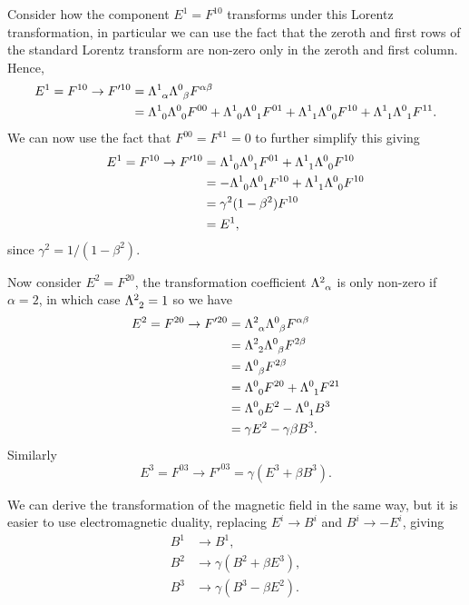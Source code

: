 Consider how the component \(E^1 = F^{10}\) transforms under this Lorentz transformation, in particular we can use the fact that the zeroth and first rows of the standard Lorentz transform are non-zero only in the zeroth and first column.
Hence,
\begin{align}
    E^1 = F^{10} \to F'^{10} &= \tensor{\Lambda}{^1_\alpha} \tensor{\Lambda}{^0_\beta}F^{\alpha\beta}\\
    &= \tensor{\Lambda}{^1_0}\tensor{\Lambda}{^0_0} F^{00} + \tensor{\Lambda}{^1_0}\tensor{\Lambda}{^0_1} F^{01} + \tensor{\Lambda}{^1_1}\tensor{\Lambda}{^0_0} F^{10} + \tensor{\Lambda}{^1_1}\tensor{\Lambda}{^0_1} F^{11}.\notag
\end{align}
We can now use the fact that \(F^{00} = F^{11} = 0\) to further simplify this giving
\begin{align}
    E^1 = F^{10} \to F'^{10} &= \tensor{\Lambda}{^1_0}\tensor{\Lambda}{^0_1} F^{01} + \tensor{\Lambda}{^1_1}\tensor{\Lambda}{^0_0} F^{10}\\
    &= -\tensor{\Lambda}{^1_0} \tensor{\Lambda}{^0_1} F^{10} + \tensor{\Lambda}{^1_1}\tensor{\Lambda}{^0_0}F^{10}\\
    &= \gamma^2(1 - \beta^2)F^{10}\\
    &= E^1,
\end{align}
since \(\gamma^2 = 1/(1 - \beta^2)\).

Now consider \(E^2 = F^{20}\), the transformation coefficient \(\tensor{\Lambda}{^2_\alpha}\) is only non-zero if \(\alpha = 2\), in which case \(\tensor{\Lambda}{^2_2} = 1\) so we have
\begin{align}
    E^2 = F^{20} \to F'^{20} &= \tensor{\Lambda}{^2_\alpha} \tensor{\Lambda}{^0_\beta}F^{\alpha\beta}\\
    &= \tensor{\Lambda}{^2_2}\tensor{\Lambda}{^0_\beta} F^{2\beta}\\
    &= \tensor{\Lambda}{^0_\beta} F^{2\beta}\\
    &= \tensor{\Lambda}{^0_0}F^{20} + \tensor{\Lambda}{^0_1}F^{21}\\
    &= \tensor{\Lambda}{^0_0}E^2 - \tensor{\Lambda}{^0_1}B^3\\
    &= \gamma E^2 - \gamma\beta B^3.
\end{align}
Similarly
\begin{equation}
    E^3 = F^{03} \to F'^{03} = \gamma (E^3 + \beta B^3).
\end{equation}

We can derive the transformation of the magnetic field in the same way, but it is easier to use electromagnetic duality, replacing \(E^i \to B^i\) and \(B^i \to -E^i\), giving
\begin{align}
    B^1 &\to B^1,\\
    B^2 &\to \gamma(B^2 + \beta E^3),\\
    B^3 &\to \gamma(B^3 - \beta E^2).
\end{align}

